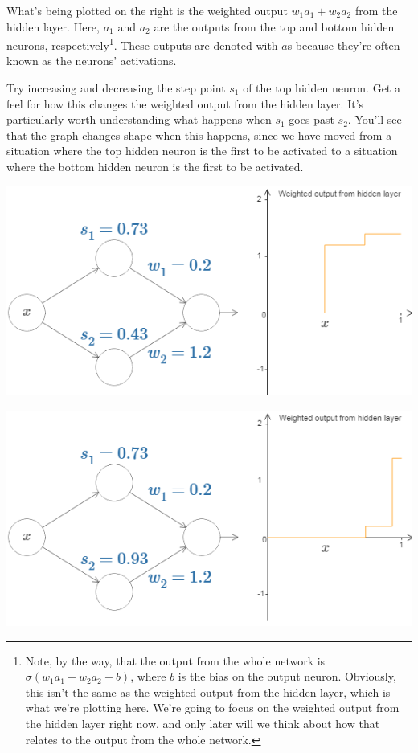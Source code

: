 What's being plotted on the right is the weighted output $w_1a_1+w_2a_2$ from the hidden layer. Here, $a_1$ and $a_2$ are the outputs from the top and bottom hidden neurons, respectively\footnote{Note, by the way, that the output from the whole network is $\sigma(w_1a_1+w_2a_2+b)$, where $b$ is the bias on the output neuron. Obviously, this isn't the same as the weighted output from the hidden layer, which is what we're plotting here. We're going to focus on the weighted output from the hidden layer right now, and only later will we think about how that relates to the output from the whole network.}. These outputs are denoted with $a$s because they're often known as the neurons' activations.

Try increasing and decreasing the step point $s_1$ of the top hidden neuron. Get a feel for how this changes the weighted output from the hidden layer. It's particularly worth understanding what happens when $s_1$ goes past $s_2$.  You'll see that the graph changes shape when this happens, since we have moved from a situation where the top hidden neuron is the first to be activated to a situation where the bottom hidden neuron is the first to be activated.

{\centering \includegraphics[width=\textwidth,]{pic/wigglyfn12.png} \par}

{\centering \includegraphics[width=\textwidth,]{pic/wigglyfn13.png} \par}

